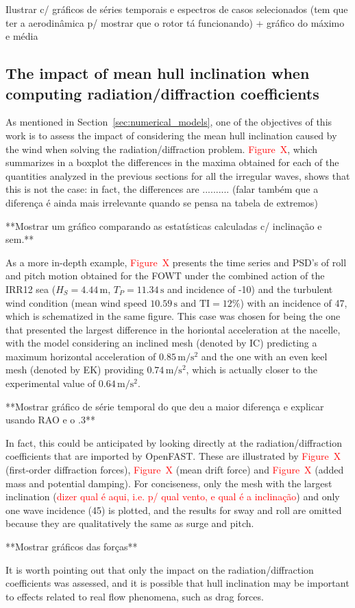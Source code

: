Ilustrar c/ gráficos de séries temporais e espectros de casos selecionados (tem que ter a aerodinâmica p/ mostrar que o rotor tá funcionando) + gráfico do máximo e média


\subsection{The impact of mean hull inclination when computing radiation/diffraction coefficients} \label{subsec:impact_inclination}
As mentioned in Section~\ref{sec:numerical_models}, one of the objectives of this work is to assess the impact of considering the mean hull inclination caused by the wind when solving the radiation/diffraction problem. \textcolor{red}{Figure~X}, which summarizes in a boxplot the differences in the maxima obtained for each of the quantities analyzed in the previous sections for all the irregular waves, shows that this is not the case: in fact, the differences are .......... (falar também que a diferença é ainda mais irrelevante quando se pensa na tabela de extremos)

**Mostrar um gráfico comparando as estatísticas calculadas c/ inclinação e sem.**

As a more in-depth example, \textcolor{red}{Figure~X} presents the time series and PSD's of roll and pitch motion obtained for the FOWT under the combined action of the IRR12 sea ($H_S=4.44\,\text{m}$, $T_P = 11.34\,\text{s}$ and incidence of -10\textdegree{}) and the turbulent wind condition (mean wind speed $10.59\,\text{s}$ and $\textrm{TI}=12\%$) with an incidence of 47\textdegree{}, which is schematized in the same figure. This case was chosen for being the one that presented the largest difference in the horiontal acceleration at the nacelle, with the model considering an inclined mesh (denoted by IC) predicting a maximum horizontal acceleration of $0.85\,\text{m}/\text{s}^2$ and the one with an even keel mesh (denoted by EK) providing $0.74\,\text{m}/\text{s}^2$, which is actually closer to the experimental value of $0.64\,\text{m}/\text{s}^2$. 

**Mostrar gráfico de série temporal do que deu a maior diferença e explicar usando RAO e o .3**

In fact, this could be anticipated by looking directly at the radiation/diffraction coefficients that are imported by OpenFAST. These are illustrated by \textcolor{red}{Figure~X} (first-order diffraction forces), \textcolor{red}{Figure~X} (mean drift force) and \textcolor{red}{Figure~X} (added mass and potential damping). For conciseness, only the mesh with the largest inclination (\textcolor{red}{dizer qual é aqui, i.e. p/ qual vento, e qual é a inclinação}) and only one wave incidence (45\textdegree{}) is plotted, and the results for sway and roll are omitted because they are qualitatively the same as surge and pitch.

**Mostrar gráficos das forças**

It is worth pointing out that only the impact on the radiation/diffraction coefficients was assessed, and it is possible that hull inclination may be important to effects related to real flow phenomena, such as drag forces.